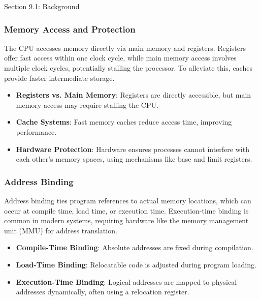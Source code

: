 \begin{notes}{Section 9.1: Background}
    \subsubsection*{Memory Access and Protection}
    
    The CPU accesses memory directly via main memory and registers. Registers offer fast access within one clock cycle, while main memory access involves multiple clock cycles, potentially stalling the 
    processor. To alleviate this, caches provide faster intermediate storage.
    
    \begin{highlight}
    
        \begin{itemize}
            \item \textbf{Registers vs. Main Memory}: Registers are directly accessible, but main memory access may require stalling the CPU.
            \item \textbf{Cache Systems}: Fast memory caches reduce access time, improving performance.
            \item \textbf{Hardware Protection}: Hardware ensures processes cannot interfere with each other's memory spaces, using mechanisms like base and limit registers.
        \end{itemize}
    
    \end{highlight}
    
    \subsubsection*{Address Binding}
    
    Address binding ties program references to actual memory locations, which can occur at compile time, load time, or execution time. Execution-time binding is common in modern systems, requiring 
    hardware like the memory management unit (MMU) for address translation.
    
    \begin{highlight}
    
        \begin{itemize}
            \item \textbf{Compile-Time Binding}: Absolute addresses are fixed during compilation.
            \item \textbf{Load-Time Binding}: Relocatable code is adjusted during program loading.
            \item \textbf{Execution-Time Binding}: Logical addresses are mapped to physical addresses dynamically, often using a relocation register.
        \end{itemize}
    

\end{highlight}
\end{notes}
